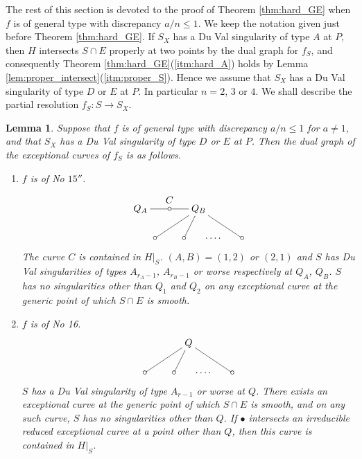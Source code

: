 \documentclass[a4paper,11pt]{amsart}
\newtheorem{lemma}[theorem]{Lemma}
\theoremstyle{definition}
\theoremstyle{remark}
\numberwithin{equation}{section}
\begin{document}
The rest of this section is devoted to the proof of Theorem \ref{thm:hard_GE}
when $f$ is of general type with discrepancy $a/n\le1$.
We keep the notation given just before Theorem \ref{thm:hard_GE}.
If $S_X$ has a Du Val singularity of type $A$ at $P$,
then $H$ intersects $S \cap E$ properly at two points
by the dual graph for $f_S$,
and consequently Theorem \ref{thm:hard_GE}(\ref{itm:hard_A}) holds
by Lemma \ref{lem:proper_intersect}(\ref{itm:proper_S}).
Hence we assume that $S_X$ has a Du Val singularity of type $D$ or $E$ at $P$.
In particular $n=2$, $3$ or $4$.
We shall describe the partial resolution $f_S \colon S \to S_X$.

\begin{lemma}\label{lem:15/16small}
Suppose that $f$ is of general type with discrepancy $a/n\le1$ for $a\neq1$,
and that $S_X$ has a Du Val singularity of type $D$ or $E$ at $P$.
Then the dual graph of the exceptional curves of $f_S$ is as follows.
\begin{enumerate}
\item
$f$ is of No $\textrm{15}''$.
\begin{align*}
\xymatrix@!0@=15pt{
Q_A \ar@{-}[rr]^>*+{\ C} &
&
*=<3.5pt>{\circ}\ar@{-}[rr] &
&
Q_B \ar@{-}[ddlll]\ar@{-}[ddl]\ar@{-}[ddrrr] &
&
&\\
&&&&&&&\\
&
*=<3.5pt>{\circ} &
&
*=<3.5pt>{\circ} &
&
\cdots\cdot &
&
*=<3.5pt>{\circ}
}
\end{align*}
The curve $C$ is contained in $H|_S$.
$(A,B)=(1,2)$ or $(2,1)$
and $S$ has Du Val singularities of types $A_{r_A-1}$, $A_{r_B-1}$ or worse
respectively at $Q_A$, $Q_B$.
$S$ has no singularities other than $Q_1$ and $Q_2$ on
any exceptional curve at the generic point of which $S \cap E$ is smooth.
\item
$f$ is of No 16.
\begin{align*}
\xymatrix@!0@=15pt{
&
&
&
Q \ar@{-}[ddlll]\ar@{-}[ddl]\ar@{-}[ddrrr] &
&
&\\
&&&&&&\\
*=<3.5pt>{\circ} &
&
*=<3.5pt>{\circ} &
&
\cdots\cdot &
&
*=<3.5pt>{\circ}
}
\end{align*}
$S$ has a Du Val singularity of type $A_{r-1}$ or worse at $Q$.
There exists an exceptional curve
at the generic point of which $S \cap E$ is smooth,
and on any such curve,
$S$ has no singularities other than $Q$.
If $\bullet$ intersects an irreducible reduced exceptional curve
at a point other than $Q$,
then this curve is contained in $H|_S$.
\end{enumerate}
\end{lemma}
\end{document}
